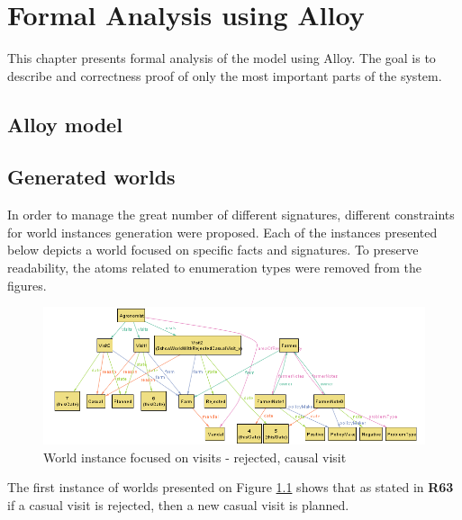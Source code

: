 \chapter{Formal Analysis using Alloy}
This chapter presents formal analysis of the model using Alloy. The goal is to describe and correctness proof of only the most important parts of the system. 

\section{Alloy model}



\section{Generated worlds}
In order to manage the great number of different signatures, different constraints for world instances generation were proposed. Each of the instances presented below depicts a world focused on specific facts and signatures. To preserve readability, the atoms related to enumeration types were removed from the figures.

\begin{figure}[H]
    \centering
    \includegraphics[width=\textwidth, keepaspectratio, origin=c]{alloy/world_instances/showWorldWithRejectedCasualVisit2.png}
    \caption{World instance focused on visits - rejected, causal visit}
    \label{fig:rejected_causal}
\end{figure}
 The first instance of worlds presented on Figure \ref{fig:rejected_causal} shows that as stated in \textbf{R63} if a casual visit is rejected, then a new casual visit is planned.
 
